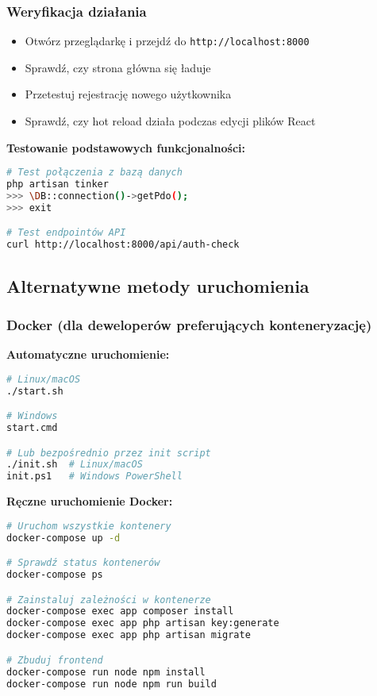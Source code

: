 \documentclass[12pt,a4paper]{article}
\begin{document}
    \subsubsection{Weryfikacja działania}

    \begin{itemize}
        \item Otwórz przeglądarkę i przejdź do \texttt{http://localhost:8000}
        \item Sprawdź, czy strona główna się ładuje
        \item Przetestuj rejestrację nowego użytkownika
        \item Sprawdź, czy hot reload działa podczas edycji plików React
    \end{itemize}

    \textbf{Testowanie podstawowych funkcjonalności:}
    \begin{lstlisting}[language=bash, caption=Testy połączenia z bazą danych]
# Test połączenia z bazą danych
php artisan tinker
>>> \DB::connection()->getPdo();
>>> exit

# Test endpointów API
curl http://localhost:8000/api/auth-check
    \end{lstlisting}

    \subsection{Alternatywne metody uruchomienia}

    \subsubsection{Docker (dla deweloperów preferujących konteneryzację)}

    \textbf{Automatyczne uruchomienie:}
    \begin{lstlisting}[language=bash, caption=Uruchomienie z Docker]
# Linux/macOS
./start.sh

# Windows
start.cmd

# Lub bezpośrednio przez init script
./init.sh  # Linux/macOS
init.ps1   # Windows PowerShell
    \end{lstlisting}

    \textbf{Ręczne uruchomienie Docker:}
    \begin{lstlisting}[language=bash, caption=Docker Compose]
# Uruchom wszystkie kontenery
docker-compose up -d

# Sprawdź status kontenerów
docker-compose ps

# Zainstaluj zależności w kontenerze
docker-compose exec app composer install
docker-compose exec app php artisan key:generate
docker-compose exec app php artisan migrate

# Zbuduj frontend
docker-compose run node npm install
docker-compose run node npm run build
    \end{lstlisting}
\end{document}
